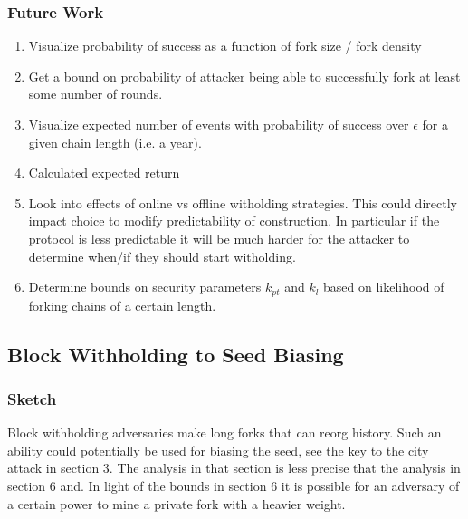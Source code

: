 \documentclass{article}
\begin{document}
\subsubsection{Future Work}
\begin{enumerate}
    \item 
    Visualize probability of success as a function of fork size / fork density
    \item
    Get a bound on probability of attacker being able to successfully fork at least some number of rounds.
    \item
    Visualize expected number of events with probability of success over $\epsilon$ for a given chain length (i.e. a year).
    \item
    Calculated expected return
    \item
    Look into effects of online vs offline witholding strategies.  This could directly impact choice to modify predictability of construction.  In particular if the protocol is less predictable it will be much harder for the attacker to determine when/if they should start witholding.
    \item
    Determine bounds on security parameters $k_{pt}$ and $k_l$ based on likelihood of forking chains of a certain length.
\end{enumerate}

\subsection{Block Withholding to Seed Biasing}

\subsubsection{Sketch}
Block withholding adversaries make long forks that can reorg history.  Such an ability could potentially be used for biasing the seed, see the key to the city attack in section 3.  The analysis in that section is less precise that the analysis in section 6 and.  In light of the bounds in section 6 it is possible for an adversary of a certain power to mine a private fork with a heavier weight.  

\end{document}
